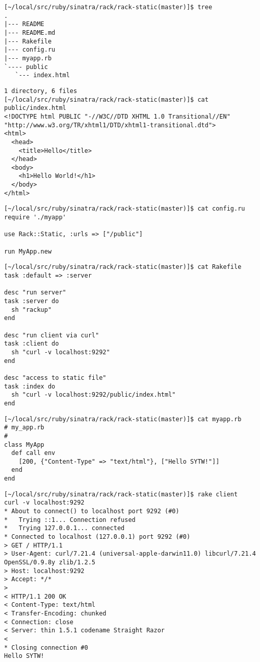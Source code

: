 
\begin{verbatim}
[~/local/src/ruby/sinatra/rack/rack-static(master)]$ tree
.
|--- README
|--- README.md
|--- Rakefile
|--- config.ru
|--- myapp.rb
`---- public
   `--- index.html
\end{verbatim}

\begin{verbatim}
1 directory, 6 files
[~/local/src/ruby/sinatra/rack/rack-static(master)]$ cat public/index.html 
<!DOCTYPE html PUBLIC "-//W3C//DTD XHTML 1.0 Transitional//EN" "http://www.w3.org/TR/xhtml1/DTD/xhtml1-transitional.dtd">
<html>
  <head>
    <title>Hello</title>
  </head>
  <body>
    <h1>Hello World!</h1>
  </body>
</html>

\end{verbatim}

\begin{verbatim}
[~/local/src/ruby/sinatra/rack/rack-static(master)]$ cat config.ru 
require './myapp'

use Rack::Static, :urls => ["/public"]

run MyApp.new
\end{verbatim}

\begin{verbatim}
[~/local/src/ruby/sinatra/rack/rack-static(master)]$ cat Rakefile 
task :default => :server

desc "run server"
task :server do
  sh "rackup"
end

desc "run client via curl"
task :client do
  sh "curl -v localhost:9292"
end

desc "access to static file"
task :index do
  sh "curl -v localhost:9292/public/index.html"
end
\end{verbatim}

\begin{verbatim}
[~/local/src/ruby/sinatra/rack/rack-static(master)]$ cat myapp.rb 
# my_app.rb
#
class MyApp
  def call env
    [200, {"Content-Type" => "text/html"}, ["Hello SYTW!"]] 
  end
end
\end{verbatim}

\begin{verbatim}
[~/local/src/ruby/sinatra/rack/rack-static(master)]$ rake client
curl -v localhost:9292
* About to connect() to localhost port 9292 (#0)
*   Trying ::1... Connection refused
*   Trying 127.0.0.1... connected
* Connected to localhost (127.0.0.1) port 9292 (#0)
> GET / HTTP/1.1
> User-Agent: curl/7.21.4 (universal-apple-darwin11.0) libcurl/7.21.4 OpenSSL/0.9.8y zlib/1.2.5
> Host: localhost:9292
> Accept: */*
> 
< HTTP/1.1 200 OK
< Content-Type: text/html
< Transfer-Encoding: chunked
< Connection: close
< Server: thin 1.5.1 codename Straight Razor
< 
* Closing connection #0
Hello SYTW!
\end{verbatim}

